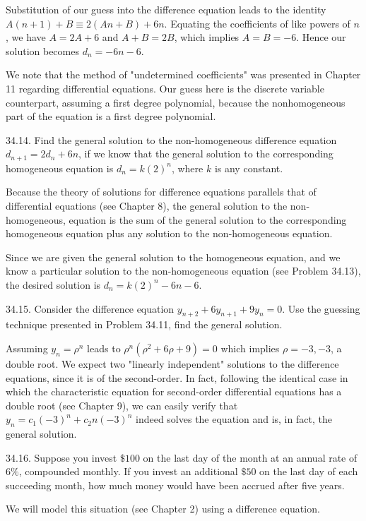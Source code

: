 \documentclass[10pt]{article}
\begin{document}
Substitution of our guess into the difference equation leads to the identity $A(n+1)+B \equiv 2(A n+B)+6 n$. Equating the coefficients of like powers of $n$, we have $A=2 A+6$ and $A+B=2 B$, which implies $A=B=-6$. Hence our solution becomes $d_{n}=-6 n-6$.

We note that the method of "undetermined coefficients" was presented in Chapter 11 regarding differential equations. Our guess here is the discrete variable counterpart, assuming a first degree polynomial, because the nonhomogeneous part of the equation is a first degree polynomial.

34.14. Find the general solution to the non-homogeneous difference equation $d_{n+1}=2 d_{n}+6 n$, if we know that the general solution to the corresponding homogeneous equation is $d_{n}=k(2)^{n}$, where $k$ is any constant.

Because the theory of solutions for difference equations parallels that of differential equations (see Chapter 8), the general solution to the non-homogeneous, equation is the sum of the general solution to the corresponding homogeneous equation plus any solution to the non-homogeneous equation.

Since we are given the general solution to the homogeneous equation, and we know a particular solution to the non-homogeneous equation (see Problem 34.13), the desired solution is $d_{n}=k(2)^{n}-6 n-6$.

34.15. Consider the difference equation $y_{n+2}+6 y_{n+1}+9 y_{n}=0$. Use the guessing technique presented in Problem 34.11, find the general solution.

Assuming $y_{n}=\rho^{n}$ leads to $\rho^{n}\left(\rho^{2}+6 \rho+9\right)=0$ which implies $\rho=-3,-3$, a double root. We expect two "linearly independent" solutions to the difference equations, since it is of the second-order. In fact, following the identical case in which the characteristic equation for second-order differential equations has a double root (see Chapter 9), we can easily verify that $y_{n}=c_{1}(-3)^{n}+c_{2} n(-3)^{n}$ indeed solves the equation and is, in fact, the general solution.

34.16. Suppose you invest $\$ 100$ on the last day of the month at an annual rate of $6 \%$, compounded monthly. If you invest an additional $\$ 50$ on the last day of each succeeding month, how much money would have been accrued after five years.

We will model this situation (see Chapter 2) using a difference equation.
\end{document}
